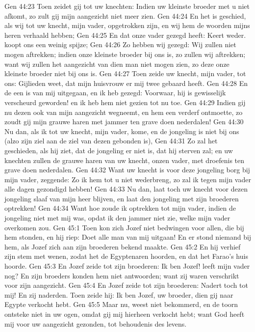 Gen 44:23  Toen zeidet gij tot uw knechten: Indien uw kleinste broeder met u niet afkomt, zo zult gij mijn aangezicht niet meer zien.
Gen 44:24  En het is geschied, als wij tot uw knecht, mijn vader, opgetrokken zijn, en wij hem de woorden mijns heren verhaald hebben;
Gen 44:25  En dat onze vader gezegd heeft: Keert weder. koopt ons een weinig spijze;
Gen 44:26  Zo hebben wij gezegd: Wij zullen niet mogen aftrekken; indien onze kleinste broeder bij ons is, zo zullen wij aftrekken; want wij zullen het aangezicht van dien man niet mogen zien, zo deze onze kleinste broeder niet bij ons is.
Gen 44:27  Toen zeide uw knecht, mijn vader, tot ons: Gijlieden weet, dat mijn huisvrouw er mij twee gebaard heeft.
Gen 44:28  En de een is van mij uitgegaan, en ik heb gezegd: Voorwaar, hij is gewisselijk verscheurd geworden! en ik heb hem niet gezien tot nu toe.
Gen 44:29  Indien gij nu dezen ook van mijn aangezicht wegneemt, en hem een verderf ontmoette, zo zoudt gij mijn grauwe haren met jammer ten grave doen nederdalen!
Gen 44:30  Nu dan, als ik tot uw knecht, mijn vader, kome, en de jongeling is niet bij ons (alzo zijn ziel aan de ziel van dezen gebonden is),
Gen 44:31  Zo zal het geschieden, als hij ziet, dat de jongeling er niet is, dat hij sterven zal; en uw knechten zullen de grauwe haren van uw knecht, onzen vader, met droefenis ten grave doen nederdalen.
Gen 44:32  Want uw knecht is voor deze jongeling borg bij mijn vader, zeggende: Zo ik hem tot u niet wederbreng, zo zal ik tegen mijn vader alle dagen gezondigd hebben!
Gen 44:33  Nu dan, laat toch uw knecht voor dezen jongeling slaaf van mijn heer blijven, en laat den jongeling met zijn broederen optrekken!
Gen 44:34  Want hoe zoude ik optrekken tot mijn vader, indien de jongeling niet met mij was, opdat ik den jammer niet zie, welke mijn vader overkomen zou.
Gen 45:1  Toen kon zich Jozef niet bedwingen voor allen, die bij hem stonden, en hij riep: Doet alle man van mij uitgaan! En er stond niemand bij hem, als Jozef zich aan zijn broederen bekend maakte.
Gen 45:2  En hij verhief zijn stem met wenen, zodat het de Egyptenaren hoorden, en dat het Farao's huis hoorde.
Gen 45:3  En Jozef zeide tot zijn broederen: Ik ben Jozef! leeft mijn vader nog? En zijn broeders konden hem niet antwoorden; want zij waren verschrikt voor zijn aangezicht.
Gen 45:4  En Jozef zeide tot zijn broederen: Nadert toch tot mij! En zij naderden. Toen zeide hij: Ik ben Jozef, uw broeder, dien gij naar Egypte verkocht hebt.
Gen 45:5  Maar nu, weest niet bekommerd, en de toorn ontsteke niet in uw ogen, omdat gij mij hierheen verkocht hebt; want God heeft mij voor uw aangezicht gezonden, tot behoudenis des levens.
